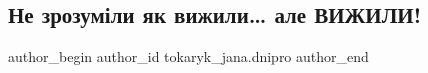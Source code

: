  
 
 
 
 

\subsection{Не зрозуміли як вижили… але ВИЖИЛИ!}
\label{sec:31_12_2022.fb.tokaryk_jana.dnipro.1.ne_zrozum_li_yak_viz}

\ifcmt
 author_begin
   author_id tokaryk_jana.dnipro
 author_end
\fi
